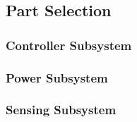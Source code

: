 \subsection{Part Selection}
\subsubsection{Controller Subsystem}
\subsubsection{Power Subsystem}
\subsubsection{Sensing Subsystem}